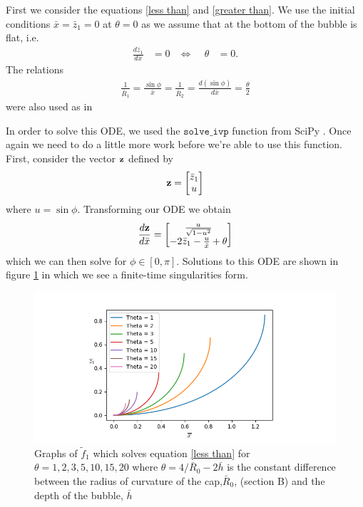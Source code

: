 First we consider the equations \ref{less than} and \ref{greater than}. We use the initial conditions $\bar{x}=\bar{z}_1=0$ at $\theta=0$ as we assume that at the bottom of the bubble is flat, i.e.
\begin{align}
    \frac{d\bar{z}_1}{d\bar{x}}&=0&
    \Leftrightarrow \:\:\:\:\:\theta&=0.
\end{align}
The relations
\begin{align}
    \frac{1}{\bar{R}_1}=\frac{\sin\phi}{\bar{x}}=\frac{1}{\bar{R}_2}=\frac{d(\sin\phi)}{d\bar{x}}=\frac{\theta}{2}
\end{align}
were also used as in \cite{toba1959drop}

In order to solve this ODE, we used the $\texttt{solve\_ivp}$ function from SciPy \cite{2020SciPy-NMeth}. Once again we need to do a little more work before we're able to use this function. First, consider the vector $\bf{z}$ defined by
\begin{align}
    \bf{z} = \begin{bmatrix}
           \bar{z}_1 \\
           u \\
         \end{bmatrix}
\end{align}
where $u=\sin \phi$. Transforming our ODE we obtain
\begin{align}
    \frac{d\bf{z}}{d\bar{x}}=\begin{bmatrix}
           \frac{u}{\sqrt{1-u^2}} \\
           -2\bar{z}_1 - \frac{u}{\bar{x}}+\theta \\
         \end{bmatrix}
\end{align}
which we can then solve for $\phi \in [0,\pi]$. Solutions to this ODE are shown in figure \ref{fig:5} in which we see a finite-time singularities form.
\begin{figure}
    \centering
    \includegraphics[width=0.85\linewidth]{WriteUp/images/bottom curve.png}
    \caption{Graphs of $\tilde{f}_1$ which solves equation \ref{less than} for $\theta=1,2,3,5,10,15,20$ where $\theta = 4/\bar{R}_0 - 2\bar{h}$ is the constant difference between the radius of curvature of the cap,$\bar{R}_0$, (section B) and the depth of the bubble, $\bar{h}$}
    \label{fig:5}
\end{figure}
